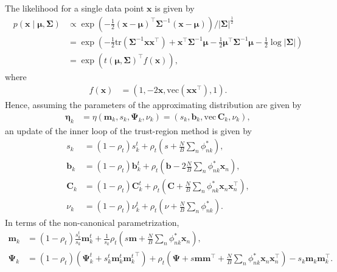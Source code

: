 \documentclass[a4paper]{article}
\begin{document}
			The likelihood for a single data point $\mathbf{x}$ is given by
			\begin{align}
				p(\mathbf{x} \mid \bm{\mu}, \bm{\Sigma})
					&\propto \exp\left( -\frac{1}{2} (\mathbf{x} - \bm{\mu})^\top \bm{\Sigma}^{-1} (\mathbf{x} - \bm{\mu}) \right) / |\bm{\Sigma}|^\frac{1}{2} \\
					&= \exp\left( -\frac{1}{2} \text{tr}\left(\bm{\Sigma}^{-1} \mathbf{x}\mathbf{x}^\top \right) + \mathbf{x}^\top \bm{\Sigma}^{-1}\bm{\mu} - \frac{1}{2} \bm{\mu}^\top \bm{\Sigma}^{-1} \bm{\mu} - \frac{1}{2} \log |\bm{\Sigma}| \right) \\
					&= \exp\left( t(\bm{\mu}, \bm{\Sigma})^\top f(\mathbf{x}) \right),
			\end{align}
			where
			\begin{align}
				f(\mathbf{x}) 
					&= \left(1, -2\mathbf{x}, \text{vec}\left(\mathbf{x}\mathbf{x}^\top\right), 1 \right).
			\end{align}
			Hence, assuming the parameters of the approximating distribution are given by
			\begin{align}
				\bm{\eta}_k 
				&= \eta(\mathbf{m}_k, s_k, \bm{\Psi}_k, \nu_k)
				= \left( s_k, \mathbf{b}_k, \text{vec}\, \mathbf{C}_k, \nu_k \right),
			\end{align}
			an update of the inner loop of the trust-region method is given by
			\begin{align}
				s_k &= (1 - \rho_t) s_k^t + \rho_t \left( s + \frac{N}{B} \sum_n \phi_{nk}^* \right), \\
				\mathbf{b}_k &= (1 - \rho_t) \mathbf{b}_k^t + \rho_t \left( \mathbf{b} - 2 \frac{N}{B} \sum_n \phi_{nk}^* \mathbf{x}_n \right), \\
				\mathbf{C}_k &= (1 - \rho_t) \mathbf{C}_k^t + \rho_t \left(\mathbf{C} + \frac{N}{B} \sum_n \phi_{nk}^* \mathbf{x}_n\mathbf{x}_n^\top \right), \\
				\nu_k &= (1 - \rho_t) \nu_k^t + \rho_t \left(\nu + \frac{N}{B} \sum_n \phi_{nk}^* \right).
			\end{align}
			In terms of the non-canonical parametrization,
			\begin{align}
				\mathbf{m}_k &= (1 - \rho_t) \frac{s_k^t}{s_k} \mathbf{m}_k^t + \frac{1}{s_k} \rho_t \left( s\mathbf{m} + \frac{N}{B} \sum_n \phi_{nk}^* \mathbf{x}_n \right), \\
				\bm{\Psi}_k &= (1 - \rho_t) \left(\bm{\Psi}_k^t +
			s_k^t\mathbf{m}_k^t{\mathbf{m}_k^t}^\top\right) + \rho_t \left(\bm{\Psi} + s\mathbf{m}\mathbf{m}^\top + \frac{N}{B} \sum_n \phi_{nk}^* \mathbf{x}_n\mathbf{x}_n^\top \right) - s_k\mathbf{m}_k\mathbf{m}_k^\top.
			\end{align}
\end{document}
